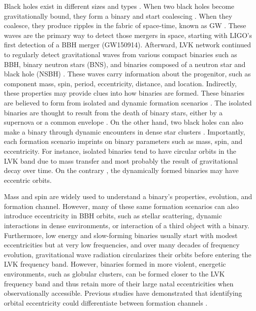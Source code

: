 \documentclass[twocolumn,prd,nofootinbib]{revtex4}
\begin{document}
Black holes exist in different sizes and types \cite{Frolic_BH_Book_2011}. When two black holes become gravitationally bound, they form a binary and start coalescing 
\cite{Peters-1963}. When they coalesce, they produce ripples in the fabric of space-time, known as GW \cite{Frolic_BH_Book_2011}. 
These waves are the primary way to detect those mergers in space, 
starting with LIGO's \cite{LIGO_2015} first detection of a BBH merger (GW150914). Afterward, LVK network 
\cite{LIGO_2015, VIRGO_2012, Virgo-2015,2021PTEP.2021eA101A} continued to regularly detect gravitational waves from 
various compact binaries such as BBH, binary neutron stars (BNS), and binaries composed
of a neutron star and black hole (NSBH) \cite{2019PhRvX...9c1040A,2021PhRvX..11b1053A,2021arXiv210801045T,2023PhRvX..13d1039A}. These waves carry 
information about the progenitor, such as component mass, spin, period, eccentricity, distance, and location.
Indirectly, these properties may provide clues into how binaries are formed. These binaries are believed to form from isolated and dynamic formation scenarios \cite{Mandel-2022}. The isolated binaries are thought to result from the death of binary stars, either 
by a supernova or a common envelope \cite{Mapelli-2020,steinle-2021}. On the other hand, two black holes
can also make a binary through dynamic encounters in dense star clusters \cite{Antonini-2016,antonini-2019}.
Importantly, each formation scenario imprints on binary parameters such as mass, spin, and eccentricity. 
For instance, isolated binaries tend to have circular orbits in the LVK band due to mass transfer and most
probably the result of gravitational decay over time. On the contrary \cite{Mapelli-2020}, the dynamically 
formed binaries may have eccentric orbits.


Mass and spin are widely used to understand a binary's properties, evolution, and formation channel. 
However, many of these same formation scenarios can also introduce eccentricity in BBH orbits, such as stellar scattering, dynamic interactions in dense environments, or interaction of a third object with a binary. Furthermore, low energy and slow-forming binaries usually start with modest eccentricities but at very low frequencies, 
and over many decades of frequency evolution, gravitational wave radiation circularizes their orbits 
\cite{Peters-1964} before entering the LVK frequency band. However, binaries formed in more violent, 
energetic environments, such as globular clusters, can be formed closer to the LVK frequency band and thus 
retain more of their large natal eccentricities when observationally accessible.   Previous studies have 
demonstrated that identifying orbital eccentricity could differentiate between formation channels 
\cite{Rod-2018, zevin-samsing-2019, samsing-2018, Rodriguez-2018, Antonini-2014}. 
\end{document}
